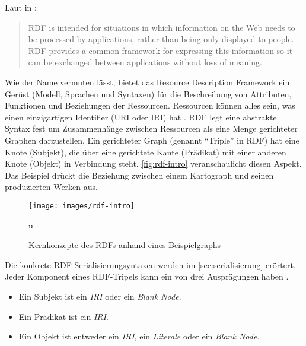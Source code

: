 Laut \citeauthor{Schreiber:14:RP} in : 

\hyphenblockquote{german}{RDF is intended for situations in which information on the Web needs to be processed by applications, rather than being only displayed to people. RDF provides a common framework for expressing this information so it can be exchanged between applications without loss of meaning.} 

Wie der Name vermuten lässt, bietet das Resource Description Framework ein Gerüst (Modell, Sprachen und Syntaxen) für die Beschreibung von Attributen, Funktionen und Beziehungen der Ressourcen. Ressourcen können alles sein, was einen einzigartigen Identifier (URI oder IRI) hat \parencite[vgl.][Folie~6]{Dekeyzer2013}. RDF legt eine abstrakte Syntax fest um Zusammenhänge zwischen Ressourcen als eine Menge gerichteter Graphen darzustellen. Ein gerichteter Graph (genannt \hyphenquote{german}{Triple} in RDF) hat eine Knote (Subjekt), die über eine gerichtete Kante (Prädikat) mit einer anderen Knote (Objekt) in Verbindung steht. \autoref{fig:rdf-intro} veranschaulicht diesen Aspekt. Das Beispiel\footnotemark{} drückt die Beziehung zwischen einem Kartograph und seinen produzierten Werken aus. 


\begin{figure}[h]
	\centering
	\texttt{[image: images/rdf-intro]}
	\caption[Kernkonzepte des RDFs]{Kernkonzepte des RDFs anhand eines Beispielgraphs}
	\label{fig:rdf-intro}
u\end{figure}

Die konkrete RDF-Serialisierungsyntaxen werden im \autoref{sec:serialisierung} erörtert. Jeder Komponent eines RDF-Tripels kann ein von drei Ausprägungen haben \parencite[vgl.][Abs.~3.1]{Wood:14:RCA}.

\begin{itemize}
	\item Ein Subjekt ist ein \textit{IRI} oder ein \textit{Blank Node}.
	\item Ein Prädikat ist ein \textit{IRI}.
	\item Ein Objekt ist entweder ein \textit{IRI}, ein \textit{Literale} oder ein \textit{Blank Node}.
\end{itemize}

